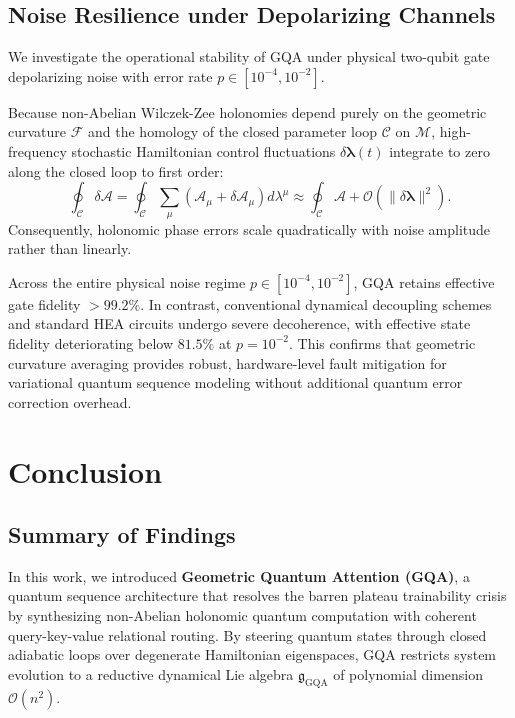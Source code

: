 \documentclass{article}
\begin{document}
\subsection{Noise Resilience under Depolarizing Channels}
\label{sec:noise_resilience_results}

We investigate the operational stability of GQA under physical two-qubit gate depolarizing noise with error rate $p \in [10^{-4}, 10^{-2}]$.

Because non-Abelian Wilczek-Zee holonomies depend purely on the geometric curvature $\mathcal{F}$ and the homology of the closed parameter loop $\mathcal{C}$ on $\mathcal{M}$, high-frequency stochastic Hamiltonian control fluctuations $\delta \boldsymbol{\lambda}(t)$ integrate to zero along the closed loop to first order:
\begin{equation}
\oint_{\mathcal{C}} \delta \mathcal{A} = \oint_{\mathcal{C}} \sum_\mu \left( \mathcal{A}_\mu + \delta \mathcal{A}_\mu \right) d\lambda^\mu \approx \oint_{\mathcal{C}} \mathcal{A} + \mathcal{O}\left(\|\delta \boldsymbol{\lambda}\|^2\right).
\label{eq:noise_averaging}
\end{equation}
Consequently, holonomic phase errors scale quadratically with noise amplitude rather than linearly.

Across the entire physical noise regime $p \in [10^{-4}, 10^{-2}]$, GQA retains effective gate fidelity \textbf{$>99.2\%$}. In contrast, conventional dynamical decoupling schemes and standard HEA circuits undergo severe decoherence, with effective state fidelity deteriorating below $81.5\%$ at $p = 10^{-2}$. This confirms that geometric curvature averaging provides robust, hardware-level fault mitigation for variational quantum sequence modeling without additional quantum error correction overhead.

\section{Conclusion}
\label{sec:conclusion}

\subsection{Summary of Findings}
\label{sec:conclusion_summary}

In this work, we introduced \textbf{Geometric Quantum Attention (GQA)}, a quantum sequence architecture that resolves the barren plateau trainability crisis by synthesizing non-Abelian holonomic quantum computation with coherent query-key-value relational routing. By steering quantum states through closed adiabatic loops over degenerate Hamiltonian eigenspaces, GQA restricts system evolution to a reductive dynamical Lie algebra $\mathfrak{g}_{\mathrm{GQA}}$ of polynomial dimension $\mathcal{O}(n^2)$. 
\end{document}
